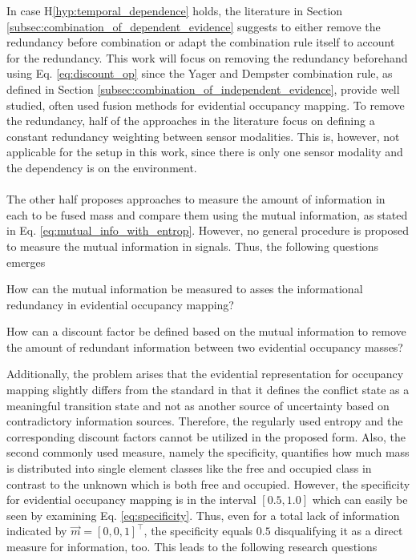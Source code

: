 In case H\ref{hyp:temporal_dependence} holds, the literature in Section \ref{subsec:combination_of_dependent_evidence} suggests to either remove the redundancy before combination or adapt the combination rule itself to account for the redundancy. This work will focus on removing the redundancy beforehand using Eq. \ref{eq:discount_op} since the Yager and Dempster combination rule, as defined in Section \ref{subsec:combination_of_independent_evidence}, provide well studied, often used fusion methods for evidential occupancy mapping. To remove the redundancy, half of the approaches in the literature focus on defining a constant redundancy weighting between sensor modalities. This is, however, not applicable for the setup in this work, since there is only one sensor modality and the dependency is on the environment.
\\\\
The other half proposes approaches to measure the amount of information in each to be fused mass and compare them using the mutual information, as stated in Eq. \ref{eq:mutual_info_with_entrop}. However, no general procedure is proposed to measure the mutual information in signals. Thus, the following questions emerges
\begin{requ} \label{requ:how_to_meas_redund}
	How can the mutual information be measured to asses the informational redundancy in evidential occupancy mapping?
\end{requ}
\begin{requ} \label{requ:how_to_define_discount_fact}
	How can a discount factor be defined based on the mutual information to remove the amount of redundant information between two evidential occupancy masses?
\end{requ}
Additionally, the problem arises that the evidential representation for occupancy mapping slightly differs from the standard in that it defines the conflict state as a meaningful transition state and not as another source of uncertainty based on contradictory information sources. Therefore, the regularly used entropy and the corresponding discount factors cannot be utilized in the proposed form. Also, the second commonly used measure, namely the specificity, quantifies how much mass is distributed into single element classes like the free and occupied class in contrast to the unknown which is both free and occupied. However, the specificity for evidential occupancy mapping is in the interval $[0.5,1.0]$ which can easily be seen by examining Eq. \ref{eq:specificity}. Thus, even for a total lack of information indicated by $\vec{m} = [0,0,1]^\top$, the specificity equals $0.5$ disqualifying it as a direct measure for information, too. This leads to the following research questions 

